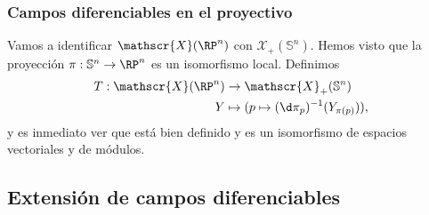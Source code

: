 \subsubsection{Campos diferenciables en el proyectivo}

Vamos a identificar $\mathscr{X}(\RP^{n})$ con
$\mathscr{X}_{+}(\mathbb{S}^{n})$. Hemos visto que la proyección $\pi:
\mathbb{S}^{n}\to \RP^{n}$ es un isomorfismo local. Definimos
\begin{alignat*}{2}
  T: \mathscr{X}(\RP^{n}) & \to \mathscr{X}_{+}(\mathbb{S}^{n}) \\
 Y & \mapsto (p\mapsto (\d\pi_{p})^{-1}(Y_{\pi(p)})),
\end{alignat*}
y es inmediato ver que está bien definido y es un isomorfismo de espacios
vectoriales y de módulos.

\subsection{Extensión de campos diferenciables}

